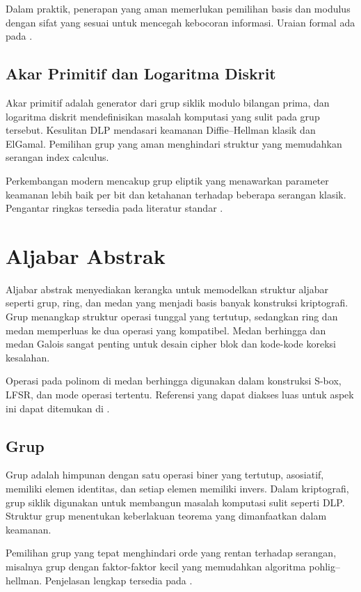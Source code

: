 \documentclass[../main.tex]{subfiles}
\begin{document}
Dalam praktik, penerapan yang aman memerlukan pemilihan basis dan modulus dengan sifat yang sesuai untuk mencegah kebocoran informasi. Uraian formal ada pada \textcite{menezes1996handbook}.

\subsection{Akar Primitif dan Logaritma Diskrit}
Akar primitif adalah generator dari grup siklik modulo bilangan prima, dan logaritma diskrit mendefinisikan masalah komputasi yang sulit pada grup tersebut. Kesulitan DLP mendasari keamanan Diffie--Hellman klasik dan ElGamal. Pemilihan grup yang aman menghindari struktur yang memudahkan serangan index calculus.

Perkembangan modern mencakup grup eliptik yang menawarkan parameter keamanan lebih baik per bit dan ketahanan terhadap beberapa serangan klasik. Pengantar ringkas tersedia pada literatur standar \parencite{menezes1996handbook,bonehshoup2020}.

\section{Aljabar Abstrak}
Aljabar abstrak menyediakan kerangka untuk memodelkan struktur aljabar seperti grup, ring, dan medan yang menjadi basis banyak konstruksi kriptografi. Grup menangkap struktur operasi tunggal yang tertutup, sedangkan ring dan medan memperluas ke dua operasi yang kompatibel. Medan berhingga dan medan Galois sangat penting untuk desain cipher blok dan kode-kode koreksi kesalahan.

Operasi pada polinom di medan berhingga digunakan dalam konstruksi S-box, LFSR, dan mode operasi tertentu. Referensi yang dapat diakses luas untuk aspek ini dapat ditemukan di \textcite{menezes1996handbook}.

\subsection{Grup}
Grup adalah himpunan dengan satu operasi biner yang tertutup, asosiatif, memiliki elemen identitas, dan setiap elemen memiliki invers. Dalam kriptografi, grup siklik digunakan untuk membangun masalah komputasi sulit seperti DLP. Struktur grup menentukan keberlakuan teorema yang dimanfaatkan dalam keamanan.

Pemilihan grup yang tepat menghindari orde yang rentan terhadap serangan, misalnya grup dengan faktor-faktor kecil yang memudahkan algoritma pohlig–hellman. Penjelasan lengkap tersedia pada \textcite{menezes1996handbook}.
\end{document}
